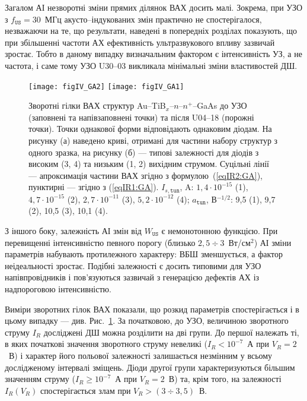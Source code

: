Загалом АІ незворотні зміни прямих ділянок ВАХ досить малі.
Зокрема, при УЗО з $f_\mathtt{US}=30$~МГц акусто--індукованих змін практично не спостерігалося,
незважаючи на те, що результати, наведені в попередніх розділах показують, що при збільшенні частоти АХ
ефективність ультразвукового впливу зазвичай зростає.
Тобто в даному випадку визначальним фактором є інтенсивність УЗ, а не частота, і саме тому УЗО U30--03
викликала мінімальні зміни властивостей ДШ.

\begin{figure}
\center
\texttt{[image: figIV\_GA2]} \hfill
\texttt{[image: figIV\_GA1]}
\caption{\label{figIV_GA}
Зворотні гілки ВАХ структур Au--TiB$_x$--$n$--$n^+$--GaAs
до УЗО (заповнені та напівзаповнені точки)
та після U04--18 (порожні точки).
Точки однакової форми відповідають однаковим діодам.
На рисунку (а) наведено криві, отримані для частини набору структур з одного зразка,
на рисунку (б) --- типові залежності для діодів з високим (3, 4) та низьким (1, 2)
вихідним струмом.
Суцільні лінії --- апроксимація частини ВАХ згідно з формулою~(\ref{eqIR2:GA}),
пунктирні  --- згідно з (\ref{eqIR1:GA}).
$I_{s,\mathtt{tun}}$, A: $1,4\cdot10^{-15}$ (1), $4,7\cdot10^{-15}$ (2), $2,7\cdot10^{-11}$ (3), $5,2\cdot10^{-12}$ (4);
$a_\mathtt{tun}$, В$^{-1/2}$: 9,5 (1), 9,7 (2), 10,5 (3), 10,1 (4).
}%
\end{figure}

З іншого боку, залежність АІ змін від $W_\mathtt{US}$ є немонотонною функцією.
При перевищенні інтенсивністю певного порогу (близько $2,5\div3$~Вт/см$^2$) АІ зміни параметрів набувають
протилежного характеру:  ВБШ зменшується, а фактор неідеальності зростає.
Подібні залежності є досить типовими для УЗО напівпровідників \cite{Zdeb1989,Zaver,Zaver2005}
і пов'язуються зазвичай з генерацією дефектів АХ із надпороговою інтенсивністю.



Виміри зворотних гілок ВАХ показали, що розкид параметрів спостерігається і в цьому випадку ---
див. Рис.~\ref{figIV_GA}.
За початковою, до УЗО, величиною зворотного струму $I_R$ досліджені ДШ можна розділити на дві групи.
До першої належать ті, в яких початкові значення зворотного струму невеликі ($I_R<10^{-7}$~А
при $V_R=2$~В) і характер його
польової залежності залишається незмінним у всьому дослідженому інтервалі зміщень.
Діоди другої групи характеризуються більшим значенням струму ($I_R\geq10^{-7}$~А при $V_R=2$~В) та, крім того, на залежності $I_R(V_R)$ спостерігається злам при $V_R>(3\div3,5)$~В.


